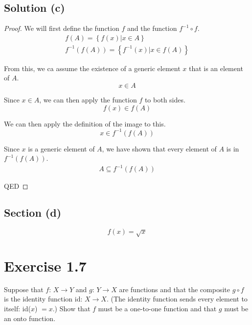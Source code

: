 \documentclass[12pt]{report}
\begin{document}
\subsection{Solution (c)}
\begin{proof}
    We will first define the function $f$ and the function $f^{-1} \circ f$.
    \begin{gather}
        f(A) = \left\{f(x) | x \in A\right\}\\
        f^{-1}(f(A)) = \left\{f^{-1}(x) | x \in f(A)\right\}
    \end{gather}

    From this, we ca assume the existence of a generic element $x$ that is an element of $A$. 
    \begin{equation}
        x \in A
    \end{equation}

    Since $x \in A$, we can then apply the function $f$ to both sides.
    \begin{equation}
        f(x) \in f(A)
    \end{equation}

    We can then apply the definition of the image to this.
    \begin{equation}
        x \in f^{-1}(f(A))
    \end{equation}

    Since $x$ is a generic element of $A$, we have shown that every element of $A$ is in $f^{-1}(f(A))$.
    \begin{gather}
        A \subseteq f^{-1}(f(A))
    \end{gather}

    QED
\end{proof}

\subsection{Section (d)}
\[f(x) = \sqrt{x}\]

\pagebreak
\section{Exercise 1.7}
Suppose that $f$: $X \rightarrow Y$ and $g$: $Y \rightarrow X$  are functions and that the composite $g \circ f$ is the identity function  id: $X \rightarrow X$. (The identity function sends every element to itself:  id($x$) $= x$.) Show that $f$ must be a one-to-one function and that $g$ must be an onto function. 
\end{document}
